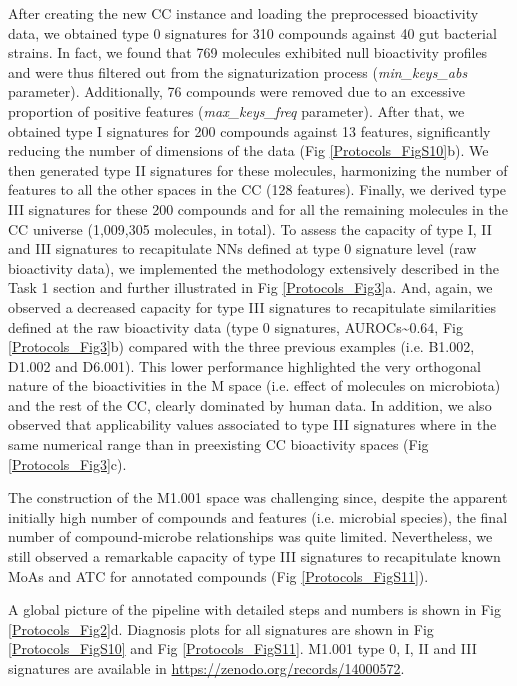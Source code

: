 After creating the new CC instance and loading the preprocessed bioactivity data, we obtained type 0 signatures for 310 compounds against 40 gut bacterial strains. In fact, we found that 769 molecules exhibited null bioactivity profiles and were thus filtered out from the signaturization process (\textit{min\_keys\_abs} parameter). Additionally, 76 compounds were removed due to an excessive proportion of positive features (\textit{max\_keys\_freq} parameter). After that, we obtained type I signatures for 200 compounds against 13 features, significantly reducing the number of dimensions of the data (Fig \ref{Protocols_FigS10}b). We then generated type II signatures for these molecules, harmonizing the number of features to all the other spaces in the CC (128 features). Finally, we derived type III signatures for these 200 compounds and for all the remaining molecules in the CC universe (1,009,305 molecules, in total). To assess the capacity of type I, II and III signatures to recapitulate NNs defined at type 0 signature level (raw bioactivity data), we implemented the methodology extensively described in the Task 1 section and further illustrated in Fig \ref{Protocols_Fig3}a. And, again, we observed a decreased capacity for type III signatures to recapitulate similarities defined at the raw bioactivity data (type 0 signatures, AUROCs\textasciitilde0.64, Fig \ref{Protocols_Fig3}b) compared with the three previous examples (i.e. B1.002, D1.002 and D6.001). This lower performance highlighted the very orthogonal nature of the bioactivities in the M space (i.e. effect of molecules on microbiota) and the rest of the CC, clearly dominated by human data. In addition, we also observed that applicability values associated to type III signatures where in the same numerical range than in preexisting CC bioactivity spaces (Fig \ref{Protocols_Fig3}c).

The construction of the M1.001 space was challenging since, despite the apparent initially high number of compounds and features (i.e. microbial species), the final number of compound-microbe relationships was quite limited. Nevertheless, we still observed a remarkable capacity of type III signatures to recapitulate known MoAs and ATC for annotated compounds (Fig \ref{Protocols_FigS11}).

A global picture of the pipeline with detailed steps and numbers is shown in Fig \ref{Protocols_Fig2}d. Diagnosis plots for all signatures are shown in Fig \ref{Protocols_FigS10} and Fig \ref{Protocols_FigS11}. M1.001 type 0, I, II and III signatures are available in \href{https://zenodo.org/records/14000572}{https://zenodo.org/records/14000572}. 

